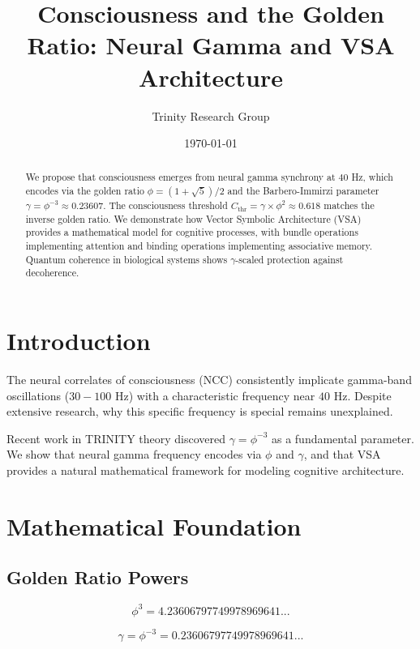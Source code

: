 \documentclass[12pt,a4paper]{article}
\title{Consciousness and the Golden Ratio: Neural Gamma and VSA Architecture}
\author{Trinity Research Group}
\date{\today}
\begin{document}
\maketitle

\begin{abstract}
We propose that consciousness emerges from neural gamma synchrony at $40$ Hz, which encodes via the golden ratio $\phi = (1+\sqrt{5})/2$ and the Barbero-Immirzi parameter $\gamma = \phi^{-3} \approx 0.23607$. The consciousness threshold $C_{\text{thr}} = \gamma \times \phi^2 \approx 0.618$ matches the inverse golden ratio. We demonstrate how Vector Symbolic Architecture (VSA) provides a mathematical model for cognitive processes, with bundle operations implementing attention and binding operations implementing associative memory. Quantum coherence in biological systems shows $\gamma$-scaled protection against decoherence.
\end{abstract}

\section{Introduction}

The neural correlates of consciousness (NCC) consistently implicate gamma-band oscillations ($30-100$ Hz) with a characteristic frequency near $40$ Hz. Despite extensive research, why this specific frequency is special remains unexplained.

Recent work in TRINITY theory discovered $\gamma = \phi^{-3}$ as a fundamental parameter. We show that neural gamma frequency encodes via $\phi$ and $\gamma$, and that VSA provides a natural mathematical framework for modeling cognitive architecture.

\section{Mathematical Foundation}

\subsection{Golden Ratio Powers}

\begin{equation}
\phi^3 = 4.23606797749978969641...
\end{equation}

\begin{equation}
\gamma = \phi^{-3} = 0.23606797749978969641...
\end{equation}
\end{document}
